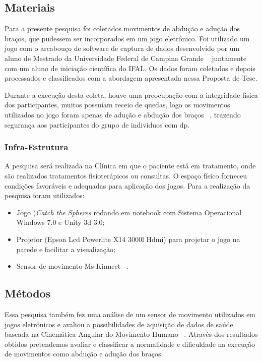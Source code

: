 \subsection{Materiais}
Para a presente pesquisa foi coletados movimentos de abdução e adução dos braços, que pudessem ser incorporados em um jogo eletrônico. Foi utilizado um jogo com o arcabouço de software de captura de dados desenvolvido por um aluno de Mestrado da Universidade Federal de Campina Grande ~\cite{antonio2013} juntamente com um aluno de iniciação científica do IFAL. Os dados foram coletados e depois processados e classificados com a abordagem apresentada nessa Proposta de Tese. 

Durante a execução desta coleta, houve uma preocupação com a integridade física dos participantes, muitos possuíam receio de quedas, logo os movimentos utilizados no jogo foram apenas de adução e abdução dos braços ~\cite{mcginnis2013biomechanics}, trazendo segurança aos participantes do grupo de indivíduos com \ac{dp}. 

\subsubsection{Infra-Estrutura}
A pesquisa será realizada na Clínica em que o paciente está em tratamento, onde são realizados tratamentos fisioterápicos ou consultas. O espaço físico forneceu condições favoráveis e adequadas para aplicação dos jogos. Para a realização da pesquisa foram utilizados:

\begin{itemize}
	\item Jogo (\textit{Catch the Spheres} rodando em notebook com Sistema Operacional Windows 7.0 e Unity 3d 3.0;
	\item Projetor (Epson Lcd Powerlite X14 3000l Hdmi) para projetar o jogo na parede e facilitar a visualização;
	\item Sensor de movimento Ms-Kinnect ~\cite{kinnect2013}.
\end{itemize}

\subsection{Métodos}
Essa pesquisa também fez uma análise de um sensor de movimento utilizados em jogos eletrônicos e avaliou a possibilidades de aquisição de dados de saúde baseada na Cinemática Angular do Movimento Humano ~\cite{hamill1999bases}.  Através dos resultados obtidos pretendemos avaliar e classificar a normalidade e dificuldade na execução de movimentos como abdução e adução dos braços.

